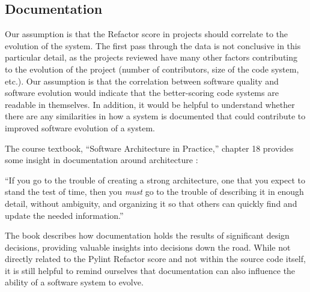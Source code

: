 \documentclass[12pt,conference]{IEEEtran}
\newcommand\todo[1]{\textcolor{red}{#1}}
\begin{document}
\vspace{0.25cm}
\subsection{Documentation} \label{sectionDocumentation}


Our assumption is that the Refactor score in projects should correlate to the evolution of the system. The first pass through the data is not conclusive in this particular detail, as the projects reviewed have many other factors contributing to the evolution of the project (number of contributors, size of the code system, etc.). Our assumption is that the correlation between software quality and software evolution would indicate that the better-scoring code systems are readable in themselves. In addition, it would be helpful to understand whether there are any similarities in how a system is documented that could contribute to improved software evolution of a system.




The course textbook, ``Software Architecture in Practice,'' chapter 18 provides some insight in documentation around architecture \cite{book:software-architecture-in-practice}:

\vspace{0.25cm}

\begin{displayquote}
``If you go to the trouble of creating a strong architecture, one that you expect to stand the test of time, then you \textit{must} go to the trouble of describing it in enough detail, without ambiguity, and organizing it so that others can quickly find and update the needed information.''
\end{displayquote}

\vspace{0.25cm}

The book describes how documentation holds the results of significant design decisions, providing valuable insights into decisions down the road. While not directly related to the Pylint Refactor score and not within the source code itself, it is still helpful to remind ourselves that documentation can also influence the ability of a software system to evolve.
\end{document}
